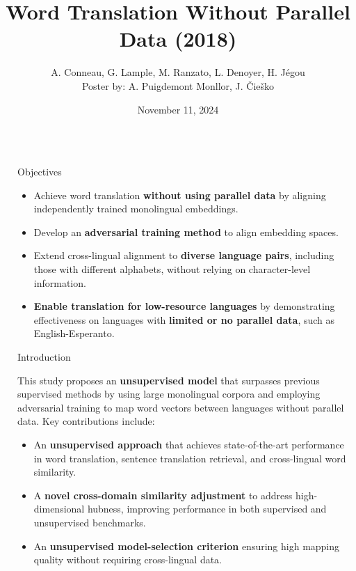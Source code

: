 \documentclass[final]{beamer}
\title[Word Translation Without Parallel Data]{\textcolor{ngreen}{Word Translation Without Parallel Data (2018)}}
\author[ ]{\textcolor{secondarycolor}{A. Conneau, G. Lample, M. Ranzato, L. Denoyer, H. Jégou\\Poster by: A. Puigdemont Monllor, J. Čieško}}
\institute[FI MU]{\textcolor{secondarycolor}{PA164: Machine Learning and NLP, Faculty of Informatics, Masaryk University, November 11, 2024}}
\date{\textcolor{primarycolor}{November 11, 2024}}
\newlength{\sepwid}
\newlength{\onecolwid}
\begin{document}
\setlength{\belowcaptionskip}{2ex}
\setlength\belowdisplayshortskip{2ex}

\begin{frame}[t]

\begin{columns}[t]

\begin{column}{\sepwid}\end{column}

\begin{column}{\onecolwid}


\begin{alertblock}{Objectives} 
\begin{itemize}
    \item Achieve word translation \textbf{without using parallel data} by aligning independently trained monolingual embeddings.
    \item Develop an \textbf{adversarial training method} to align embedding spaces.
    \item Extend cross-lingual alignment to \textbf{diverse language pairs}, including those with different alphabets, without relying on character-level information.
    \item \textbf{Enable translation for low-resource languages} by demonstrating effectiveness on languages with \textbf{limited or no parallel data}, such as English-Esperanto.
\end{itemize}
\end{alertblock}

\begin{block}{Introduction}

    This study proposes an \textbf{unsupervised model} that surpasses previous supervised methods by using large monolingual corpora and employing adversarial training to map word vectors between languages without parallel data. Key contributions include:

    \begin{itemize}
        \item An \textbf{unsupervised approach} that achieves state-of-the-art performance in word translation, sentence translation retrieval, and cross-lingual word similarity.
        \item A \textbf{novel cross-domain similarity adjustment} to address high-dimensional hubness, improving performance in both supervised and unsupervised benchmarks.
        \item An \textbf{unsupervised model-selection criterion} ensuring high mapping quality without requiring cross-lingual data.
    \end{itemize}
\end{block}


\end{column}
\end{columns}
\end{frame}
\end{document}
